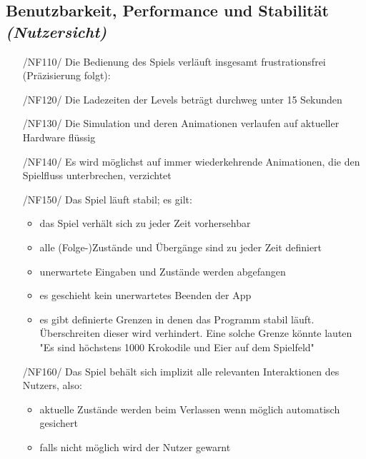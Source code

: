 \subsection{Benutzbarkeit, Performance und Stabilität \textit{(Nutzersicht)}}
\begin{itemize}
	\item[/NF110/] Die Bedienung des Spiels verläuft insgesamt frustrationsfrei (Präzisierung folgt):
	\item[/NF120/] Die Ladezeiten der Levels beträgt durchweg unter 15 Sekunden
	\item[/NF130/] Die Simulation und deren Animationen verlaufen auf aktueller Hardware flüssig
	\item[/NF140/] Es wird möglichst auf immer wiederkehrende Animationen, die den Spielfluss unterbrechen, verzichtet
	\item[/NF150/] Das Spiel läuft stabil; es gilt:
		\begin{itemize}
			\item das Spiel verhält sich zu jeder Zeit vorhersehbar
			\item alle (Folge-)Zustände und Übergänge sind zu jeder Zeit definiert
			\item unerwartete Eingaben und Zustände werden abgefangen
			\item es geschieht kein unerwartetes Beenden der App
			\item es gibt definierte Grenzen in denen das Programm stabil läuft. Überschreiten dieser wird verhindert. Eine solche Grenze könnte lauten "Es sind höchstens 1000 Krokodile und Eier auf dem Spielfeld"
		\end{itemize}
	\item[/NF160/] Das Spiel behält sich implizit alle relevanten Interaktionen des Nutzers, also:
		\begin{itemize}
			\item aktuelle Zustände werden beim Verlassen wenn möglich automatisch gesichert
			\item falls nicht möglich wird der Nutzer gewarnt
		\end{itemize}
\end{itemize}

